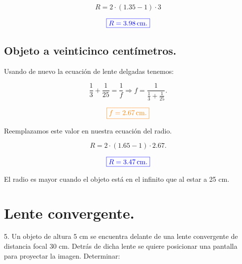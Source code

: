 \documentclass[a4paper,12pt]{article} %
\begin{document}
\[ R = 2 \cdot \left(1.35 - 1\right) \cdot 3  \]

\vspace{\baselineskip}

\[ \textcolor{blue}{\boxed{R = 3.98 \, \mathrm{cm}.}} \]

\vspace{\baselineskip}

\subsection{Objeto a veinticinco centímetros.}

\begin{justify}
	Usando de nuevo la ecuación de lente delgadas tenemos:
\end{justify}

\[ \frac{1}{3} + \frac{1}{25} = \frac{1}{f} \Rightarrow f = \frac{1}{\frac{1}{3} + \frac{1}{25}}. \]

\vspace{\baselineskip}

\[\textcolor{orange}{\boxed{f = 2.67 \, \mathrm{cm}.}}\]

\vspace{\baselineskip}

\begin{justify}
	Reemplazamos este valor en nuestra ecuación del radio.
\end{justify}

\[ R = 2 \cdot \left(1.65 - 1\right) \cdot 2.67. \]

\vspace{\baselineskip}

\[ \textcolor{blue}{\boxed{R = 3.47 \, \mathrm{cm}.}} \]

\vspace{\baselineskip}

\begin{justify}
	El radio es mayor cuando el objeto está en el infinito que al estar a 25 cm.
\end{justify}

\vspace{\baselineskip}

\section{Lente convergente.}

\begin{justify}
	5.	Un objeto de altura 5 cm se encuentra delante de una lente convergente de distancia focal 30 cm.
	Detrás de dicha lente se quiere posicionar una pantalla para proyectar la imagen. Determinar:
\end{justify}
\end{document}
